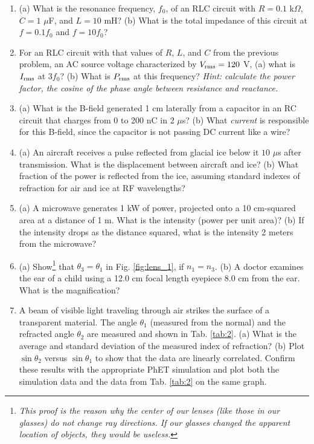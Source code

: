 \documentclass[12pt,twocolumn]{article}
\begin{document}
\begin{enumerate}
\item (a) What is the resonance frequency, $f_0$, of an RLC circuit with $R = 0.1$ k$\Omega$, $C = 1$ $\mu$F, and $L = 10$ mH? (b) What is the total impedance of this circuit at $f = 0.1f_0$ and $f = 10f_0$?
\item For an RLC circuit with that values of $R$, $L$, and $C$ from the previous problem, an AC source voltage characterized by $V_{\rm rms} = 120$ V, (a) what is $I_{\rm rms}$ at $3 f_0$? (b) What is $P_{\rm rms}$ at this frequency? \textit{Hint: calculate the power factor, the cosine of the phase angle between resistance and reactance.}
\item (a) What is the B-field generated 1 cm laterally from a capacitor in an RC circuit that charges from 0 to 200 nC in 2 $\mu$s? (b) What \textit{current} is responsible for this B-field, since the capacitor is not passing DC current like a wire?
\item (a) An aircraft receives a pulse reflected from glacial ice below it $10$ $\mu$s after transmission. What is the displacement between aircraft and ice? (b) What fraction of the power is reflected from the ice, assuming standard indexes of refraction for air and ice at RF wavelengths?
\item (a) A microwave generates 1 kW of power, projected onto a 10 cm-squared area at a distance of 1 m.  What is the intensity (power per unit area)? (b) If the intensity drops as the distance squared, what is the intensity 2 meters from the microwave?
\item (a) Show\footnote{\textit{This proof is the reason why the center of our lenses (like those in our glasses) do not change ray directions.  If our glasses changed the apparent location of objects, they would be useless.}} that $\theta_3 = \theta_1$ in Fig. \ref{fig:lens_1}, if $n_1 = n_3$. (b) A doctor examines the ear of a child using a 12.0 cm focal length eyepiece 8.0 cm from the ear. What is the magnification?
\item A beam of visible light traveling through air strikes the surface of a transparent material. 
The angle $\theta_1$ (measured from the normal) and the refracted angle $\theta_2$ are measured and shown in Tab. \ref{tab:2}.  (a) What is the average and standard deviation of the measured index of refraction? (b) Plot $\sin\theta_2$ versus $\sin\theta_1$ to show that the data are linearly correlated.  Confirm these results with the appropriate PhET simulation and plot both the simulation data and the data from Tab. \ref{tab:2} on the same graph.


\end{enumerate}
\end{document}
